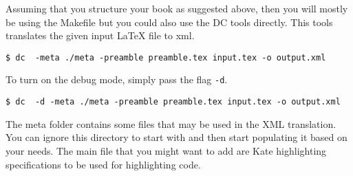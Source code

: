 \begin{gram}
Assuming that you structure your book as suggested above, then you will mostly be using the Makefile but you could also use the DC tools directly. 
%
This tools translates the given input LaTeX file to xml.

\begin{lstlisting}
$ dc  -meta ./meta -preamble preamble.tex input.tex -o output.xml
\end{lstlisting}

To turn on the debug mode, simply pass the flag \lstinline`-d`.
\begin{lstlisting}
$ dc  -d -meta ./meta -preamble preamble.tex input.tex -o output.xml
\end{lstlisting}

The meta folder contains some files that may be used in the XML translation.  You can ignore this directory to start with and then start populating it based on your needs.  The main file that you might want to add are Kate highlighting specifications to be used for highlighting code.
\end{gram}








